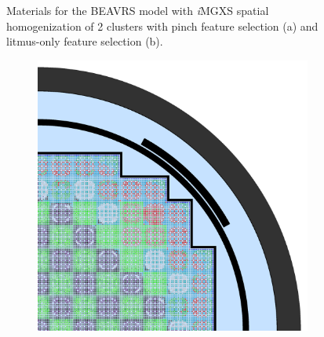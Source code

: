 \begin{figure}[h!]
\begin{subfigure}{0.67\textwidth}
  \caption{}
  \label{fig:chap10-full-core-combined-2}
\end{subfigure}
\caption[Materials for BEAVRS with \textit{i}\ac{MGXS} homogenization (2 clusters)]{Materials for the \ac{BEAVRS} model with \textit{i}\ac{MGXS} spatial homogenization of 2 clusters with pinch feature selection (a) and litmus-only feature selection (b).}
\label{fig:chap10-full-core-geometries-2}
\end{figure}

\clearpage

\begin{figure}[h!]
\centering
\begin{subfigure}{0.67\textwidth}
  \centering
  \includegraphics[width=\linewidth]{figures/unsupervised/geometries/with-features/4-clusters/pinch/full-core}
  \caption{}
  \label{fig:chap10-full-core-pinch-4}
\end{subfigure}
\begin{subfigure}{0.67\textwidth}
  \centering

\end{subfigure}
\end{figure}
